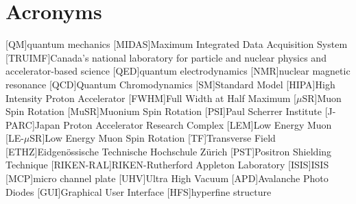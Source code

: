 \chapter{Acronyms}

\begin{acronym}[RIKEN-RAL] %
[QM]{quantum mechanics}
[MIDAS]{Maximum Integrated Data Acquisition System}
[TRUIMF]{Canada's national laboratory for particle and nuclear physics and accelerator-based science}
[QED]{quantum electrodynamics}
[NMR]{nuclear magnetic resonance}
[QCD]{Quantum Chromodynamics}
[SM]{Standard Model}
[HIPA]{High Intensity Proton Accelerator}
[FWHM]{Full Width at Half Maximum}
[$\mu$SR]{Muon Spin Rotation}
[MuSR]{Muonium Spin Rotation}
[PSI]{Paul Scherrer Institute}
[J-PARC]{Japan Proton Accelerator Research Complex}
[LEM]{Low Energy Muon}
[LE-$\mu$SR]{Low Energy Muon Spin Rotation}
[TF]{Transverse Field}
[ETHZ]{Eidgenössische Technische Hochschule Z{\"u}rich}
[PST]{Positron Shielding Technique}
[RIKEN-RAL]{RIKEN-Rutherford Appleton Laboratory}
[ISIS]{ISIS}
[MCP]{micro channel plate}
[UHV]{Ultra High Vacuum}
[APD]{Avalanche Photo Diodes}
[GUI]{Graphical User Interface}
[HFS]{hyperfine structure}
\end{acronym}

%
%
%
